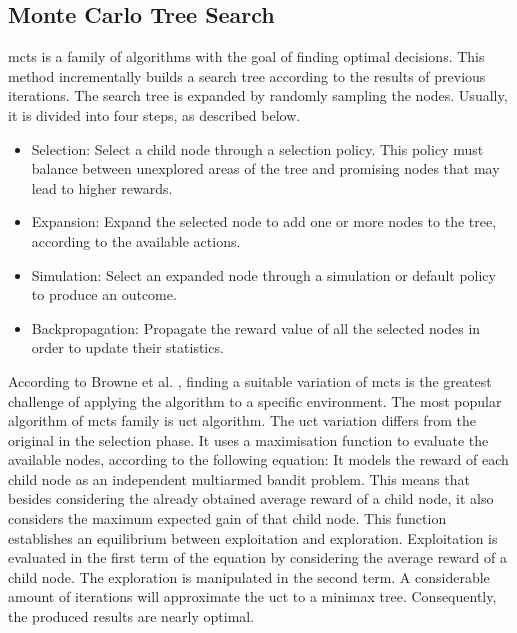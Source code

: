 \subsection{Monte Carlo Tree Search}


\gls{mcts} is a family of algorithms with the goal of finding optimal decisions.
This method incrementally builds a search tree according to the results of previous iterations.
The search tree is expanded by randomly sampling the nodes.
Usually, it is divided into four steps, as described below.
\begin{itemize}
  \item Selection: Select a child node through a selection policy. This policy must balance between unexplored areas of the tree and promising nodes that may lead to higher rewards.
  \item Expansion: Expand the selected node to add one or more nodes to the tree, according to the available actions.
  \item Simulation: Select an expanded node through a simulation or default policy to produce an outcome.
  \item Backpropagation: Propagate the reward value of all the selected nodes in order to update their statistics.
\end{itemize}

According to Browne et al. \cite{Browne2012}, finding a suitable variation of \gls{mcts} is the greatest challenge of applying the algorithm to a specific environment.
The most popular algorithm of \gls{mcts} family is \gls{uct} algorithm.
The \gls{uct} variation differs from the original in the selection phase.
It uses a maximisation function to evaluate the available nodes, according to the following equation:
It models the reward of each child node as an independent multiarmed bandit problem.
This means that besides considering the already obtained average reward of a child node, it also considers the maximum expected gain of that child node. 
This function establishes an equilibrium between exploitation and exploration.
Exploitation is evaluated in the first term of the equation by considering the average reward of a child node.
The exploration is manipulated in the second term.
A considerable amount of iterations will approximate the \gls{uct} to a minimax tree.
Consequently, the produced results are nearly optimal.

 